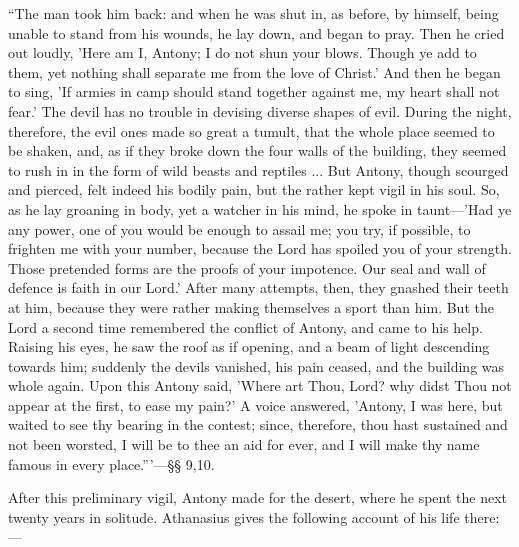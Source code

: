 ``The man took him back: and when he was shut in, as before, by
himself, being unable to stand from his wounds, he lay down, and began
to pray. Then he cried out loudly, 'Here am I, Antony; I do not shun
your blows. Though ye add to them, yet nothing shall separate me from
the love of Christ.' And then he began to sing, 'If armies in camp
should stand together against me, my heart shall not fear.' The devil
has no trouble in devising diverse shapes of evil. During the night,
therefore, the evil ones made so great a tumult, that the whole place
seemed to be shaken, and, as if they broke down the four walls of the
building, they seemed to rush in in the form of wild beasts and
reptiles ... But Antony, though scourged and pierced, felt indeed his
bodily pain, but the rather kept vigil in his soul. So, as he lay
groaning in body, yet a watcher in his mind, he spoke in taunt—'Had
ye any power, one of you would be enough to assail me; you try, if
possible, to frighten me with your number, because the Lord has
spoiled you of your strength. Those pretended forms are the proofs of
your impotence. Our seal and wall of defence is faith in our Lord.'
After many attempts, then, they gnashed their teeth at him, because
they were rather making themselves a sport than him. But the Lord a
second time remembered the conflict of Antony, and came to his help.
Raising his eyes, he saw the roof as if opening,
and a beam of light descending towards him; suddenly the devils
vanished, his pain ceased, and the building was whole again. Upon this
Antony said, 'Where art Thou, Lord? why didst Thou not appear at the
first, to ease my pain?' A voice answered, 'Antony, I was here, but
waited to see thy bearing in the contest; since, therefore, thou hast
sustained and not been worsted, I will be to thee an aid for ever, and
I will make thy name famous in every place.'''—§§ 9,10.

After this preliminary vigil, Antony made for the desert, where he
spent the next twenty years in solitude. Athanasius gives the
following account of his life there:—


